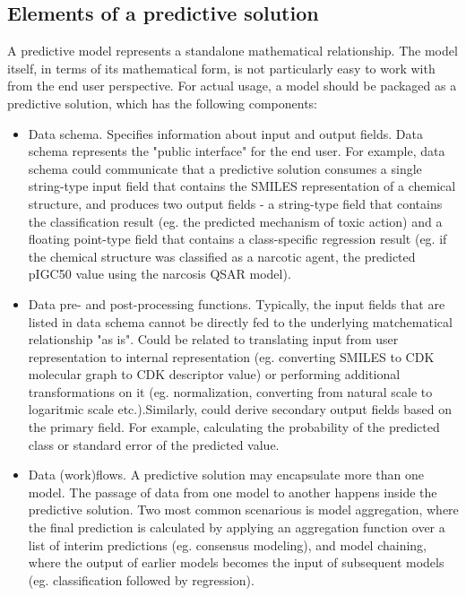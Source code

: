 \documentclass[12pt,letterpaper]{article}
\begin{document}
\subsection{Elements of a predictive solution}

A predictive model represents a standalone mathematical
relationship. The model itself, in terms of its mathematical form, is
not particularly easy to work with from the end user perspective. For
actual usage, a model should be packaged as a predictive solution,
which has the following components:
\begin{itemize}
  \item Data schema. Specifies information about input and output fields.
  Data schema represents the "public interface" for the end user. 
  For example, data schema could communicate that a predictive solution
  consumes a single string-type input field that contains the SMILES 
  representation of a chemical structure, and produces two output fields - 
  a string-type field that contains the classification result (eg. the 
  predicted mechanism of toxic action) and a floating point-type field 
  that contains a class-specific regression result (eg. if the chemical
  structure was classified as a narcotic agent, the predicted pIGC50 
  value using the narcosis QSAR model).
  \item Data pre- and post-processing functions. Typically, the input
  fields that are listed in data schema cannot be directly fed to the 
  underlying matchematical relationship "as is". Could be related to 
  translating input from user representation to internal representation
  (eg. converting SMILES to CDK molecular graph to CDK descriptor value)
  or performing additional transformations on it (eg. normalization, 
  converting from natural scale to logaritmic scale etc.).Similarly,
  could derive secondary output fields based on the primary field. For
  example, calculating the probability of the predicted class or standard
  error of the predicted value.
  \item Data (work)flows. A predictive solution may encapsulate more
  than one model. The passage of data from one model to another happens
  inside the predictive solution. Two most common scenarious is model 
  aggregation, where the final prediction is calculated by applying an
  aggregation function over a list of interim predictions (eg. consensus
  modeling), and model chaining, where the output of earlier models
  becomes the input of subsequent models (eg. classification followed 
  by regression).
\end{itemize}
\end{document}
